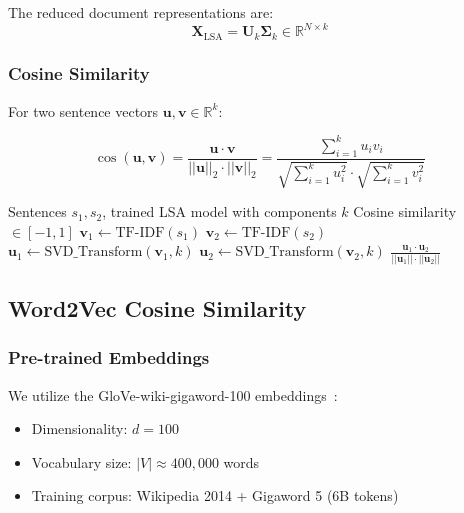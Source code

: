 \documentclass[11pt,a4paper]{article}
\begin{document}
The reduced document representations are:
\begin{equation}
\mathbf{X}_{\text{LSA}} = \mathbf{U}_k \boldsymbol{\Sigma}_k \in \mathbb{R}^{N \times k}
\end{equation}

\subsubsection{Cosine Similarity}

For two sentence vectors $\mathbf{u}, \mathbf{v} \in \mathbb{R}^k$:

\begin{equation}
\cos(\mathbf{u}, \mathbf{v}) = \frac{\mathbf{u} \cdot \mathbf{v}}{||\mathbf{u}||_2 \cdot ||\mathbf{v}||_2} = \frac{\sum_{i=1}^k u_i v_i}{\sqrt{\sum_{i=1}^k u_i^2} \cdot \sqrt{\sum_{i=1}^k v_i^2}}
\end{equation}

\begin{algorithm}[H]
\caption{LSA Cosine Similarity}
\begin{algorithmic}[1]
\Require Sentences $s_1, s_2$, trained LSA model with components $k$
\Ensure Cosine similarity $\in [-1, 1]$
\State $\mathbf{v}_1 \gets \text{TF-IDF}(s_1)$
\State $\mathbf{v}_2 \gets \text{TF-IDF}(s_2)$
\State $\mathbf{u}_1 \gets \text{SVD\_Transform}(\mathbf{v}_1, k)$
\State $\mathbf{u}_2 \gets \text{SVD\_Transform}(\mathbf{v}_2, k)$
\State \Return $\frac{\mathbf{u}_1 \cdot \mathbf{u}_2}{||\mathbf{u}_1|| \cdot ||\mathbf{u}_2||}$
\end{algorithmic}
\end{algorithm}

\subsection{Word2Vec Cosine Similarity}

\subsubsection{Pre-trained Embeddings}

We utilize the GloVe-wiki-gigaword-100 embeddings~\citep{pennington2014glove}:
\begin{itemize}
    \item Dimensionality: $d = 100$
    \item Vocabulary size: $|V| \approx 400,000$ words
    \item Training corpus: Wikipedia 2014 + Gigaword 5 (6B tokens)
\end{itemize}
\end{document}
